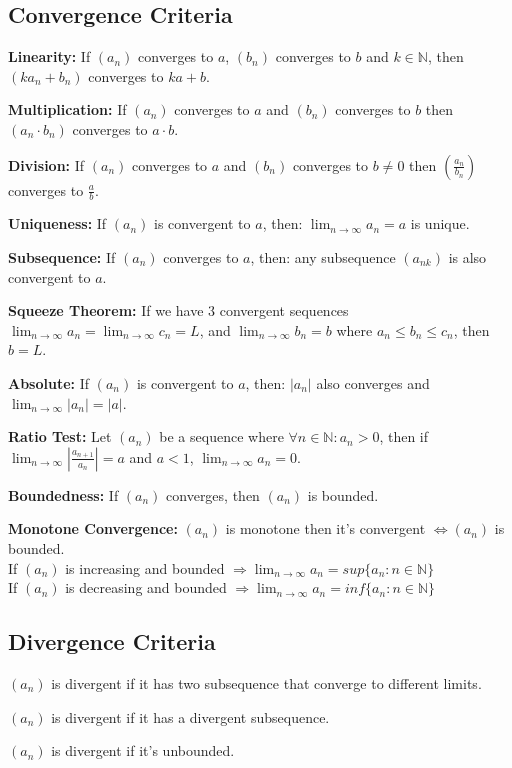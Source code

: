 \documentclass[8pt,a4paper]{extarticle}     %
\theoremstyle{definition}
\theoremstyle{definition}
\theoremstyle{definition}
\newcommand{\N}{\mathbb{N}}
\begin{document}
\begin{multicols}{4}
\subsection{Convergence Criteria}
\begin{eqlist}
	\item \textbf{Linearity:} If $(a_n)$ converges to $a$, $(b_n)$ converges to $b$ and $k\in\N$, then $(ka_n+b_n)$ converges to $ka+b$. 
	\item \textbf{Multiplication:} If $(a_n)$ converges to $a$ and $(b_n)$ converges to $b$ then $(a_n\cdot b_n)$ converges to $a\cdot b$. 
	\item \textbf{Division:} If $(a_n)$ converges to $a$ and $(b_n)$ converges to $b\neq0$ then $(\frac{a_n}{b_n})$ converges to $\frac{a}{b}$. 
	\item \textbf{Uniqueness:} If $(a_n)$ is convergent to $a$, then: $\lim_{n\to\infty}a_n = a$ is unique. 
	\item \textbf{Subsequence:} If $(a_n)$ converges to $a$, then: any subsequence $(a_{nk})$ is also convergent to $a$.
	\item \textbf{Squeeze Theorem: }If we have 3 convergent sequences $\lim_{n\to\infty}a_n=\lim_{n\to\infty}c_n=L$, and $\lim_{n\to\infty}b_n=b$ where $a_n\leq b_n \leq c_n$, then $b=L$.
	\item \textbf{Absolute:} If $(a_n)$ is convergent to $a$, then: $|a_n|$ also converges and $\lim_{n\to\infty}|a_n|=|a|$.
	\item \textbf{Ratio Test:} Let $(a_n)$ be a sequence where $\forall n\in\N: a_n>0$, then if $\lim_{n\to\infty}\left|\frac{a_{n+1}}{a_n}\right| = a$ and $a<1$, $\lim_{n\to\infty}a_n = 0$.
	\item \textbf{Boundedness:} If $(a_n)$ converges, then $(a_n)$ is bounded. 
	\item \textbf{Monotone Convergence:} $(a_n)$ is monotone then it's convergent $\Leftrightarrow (a_n)$ is bounded. \\
	If $(a_n)$ is increasing and bounded $\Rightarrow \lim_{n\to\infty}a_n= sup\{a_n: n\in\N\}$ \\
	If $(a_n)$ is decreasing and bounded $\Rightarrow \lim_{n\to\infty}a_n= inf\{a_n: n\in\N\}$ 
\end{eqlist}
\subsection{Divergence Criteria}
\begin{eqlist}
	\item $(a_n)$ is divergent if it has two subsequence that converge to different limits.
	\item $(a_n)$ is divergent if it has a divergent subsequence. 
	\item $(a_n)$ is divergent if it's unbounded. 
\end{eqlist}


\end{multicols}
\end{document}
